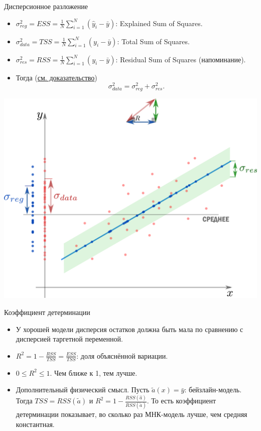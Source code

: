 \documentclass[9pt]{beamer}
\begin{document}
\begin{frame}{Дисперсионное разложение}
\begin{itemize}
    \item $\sigma^2_{reg} = ESS = \frac{1}{N}\sum_{i=1}^N (\hat y_i - \bar y)$: Explained Sum of Squares.
    \item $\sigma^2_{data} = TSS = \frac{1}{N}\sum_{i=1}^N (y_i - \bar y)$: Total Sum of Squares.
    \item $\sigma^2_{res} = RSS = \frac{1}{N}\sum_{i=1}^N (y_i - \bar y)$: Residual Sum of Squares (напоминание).
    \item Тогда (\href{https://en.wikipedia.org/wiki/Explained_sum_of_squares#Simple_derivation}{см. доказательство})
    \begin{equation}\label{linreg_variance_decomposition}
        \sigma^2_{data} = \sigma^2_{reg} + \sigma^2_{res}.
    \end{equation}
\end{itemize}
\begin{center}
    \includegraphics[height=0.55\textheight]{img/linear_regression_tss_ess_rss.png}
\end{center}
\end{frame}

\begin{frame}{Коэффициент детерминации}
    \begin{itemize}
        \item У хорошей модели дисперсия остатков должна быть мала по сравнению с дисперсией таргетной переменной.
        \item $R^2 = 1 - \frac{RSS}{TSS} = \frac{ESS}{TSS}$: доля объяснённой вариации. 
        \item $0 \leq R^2 \leq 1$. Чем ближе к 1, тем лучше.
        \item Дополнительный физический смысл. Пусть $\tilde a(x) = \bar y$: бейзлайн-модель. Тогда $TSS = RSS(\tilde a)$ и $R^2 = 1 - \frac{RSS(\hat a)}{RSS(\tilde a)}$. То есть коэффициент детерминации показывает, во сколько раз МНК-модель лучше, чем средняя константная.
    \end{itemize}
\end{frame}
\end{document}
